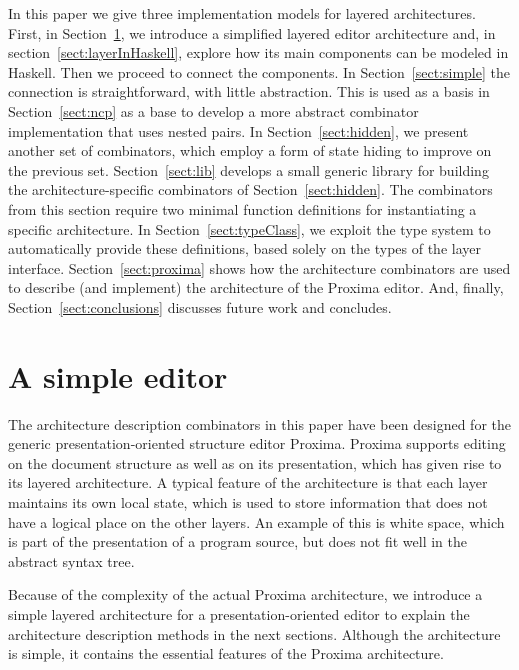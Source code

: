 \documentclass[preprint,natbib]{sigplanconf}
\begin{document}
In this paper we give three implementation models for layered architectures. First, in Section~\ref{sect:simpleEditor}, we introduce a simplified layered editor architecture and, in section~\ref{sect:layerInHaskell}, explore how its main components can be modeled in Haskell. Then we proceed to connect the components. In Section~\ref{sect:simple} the connection is straightforward, with little abstraction. This is used as a basis in Section~\ref{sect:ncp} as a base to develop a more abstract combinator implementation that uses nested pairs. In Section~\ref{sect:hidden}, we present another set of combinators, which employ a form of state hiding to improve on the previous set. Section~\ref{sect:lib} develops a small generic library for building the architecture-specific combinators of Section~\ref{sect:hidden}. The combinators from this section require two minimal function definitions for instantiating a specific architecture. In Section~\ref{sect:typeClass}, we exploit the type system to automatically provide these definitions, based solely on the types of the layer interface. Section~\ref{sect:proxima} shows how the architecture combinators are used to describe (and implement) the architecture of the Proxima editor. And, finally, Section~\ref{sect:conclusions} discusses future work and concludes.
			
			
			
\section{A simple editor}\label{sect:simpleEditor}

The architecture description combinators in this paper have been designed for the generic presentation-oriented structure editor Proxima. Proxima supports editing on the document structure as well as on its presentation, which has given rise to its layered architecture. A typical feature of the architecture is that each layer maintains its own local state, which is used to store information that does not have a logical place on the other layers. An example of this is white space, which is part of the presentation of a program source, but does not fit well in the abstract syntax tree. 

Because of the complexity of the actual Proxima architecture, we introduce a simple layered architecture for a presentation-oriented editor to explain the architecture description methods in the next sections. Although the architecture is simple, it contains the essential features of the Proxima architecture. 
\end{document}
